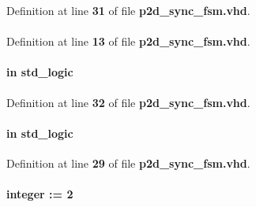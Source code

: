 Definition at line {\bf 31} of file {\bf p2d\+\_\+sync\+\_\+fsm.\+vhd}.

\paragraph[{ieee}]{\hspace{0.3cm}{\ttfamily [Library]}}\label{classp2d__sync__fsm_a0a6af6eef40212dbaf130d57ce711256}


Definition at line {\bf 13} of file {\bf p2d\+\_\+sync\+\_\+fsm.\+vhd}.

\paragraph[{mimo\+\_\+en}]{ {\bfseries \textcolor{keywordflow}{in}\textcolor{vhdlchar}{ }} {\bfseries \textcolor{comment}{std\+\_\+logic}\textcolor{vhdlchar}{ }} \hspace{0.3cm}{\ttfamily [Port]}}\label{classp2d__sync__fsm_a0c57670aee4f9fbfa3c286573012965a}


Definition at line {\bf 32} of file {\bf p2d\+\_\+sync\+\_\+fsm.\+vhd}.

\paragraph[{mode}]{ {\bfseries \textcolor{keywordflow}{in}\textcolor{vhdlchar}{ }} {\bfseries \textcolor{comment}{std\+\_\+logic}\textcolor{vhdlchar}{ }} \hspace{0.3cm}{\ttfamily [Port]}}\label{classp2d__sync__fsm_a219fe733f94bce997e904a6e45b1ac19}


Definition at line {\bf 29} of file {\bf p2d\+\_\+sync\+\_\+fsm.\+vhd}.

\paragraph[{n\+\_\+buff}]{ {\bfseries \textcolor{vhdlchar}{ }} {\bfseries \textcolor{comment}{integer}\textcolor{vhdlchar}{ }\textcolor{vhdlchar}{ }\textcolor{vhdlchar}{\+:}\textcolor{vhdlchar}{=}\textcolor{vhdlchar}{ }\textcolor{vhdlchar}{ } \textcolor{vhdldigit}{2} \textcolor{vhdlchar}{ }} \hspace{0.3cm}{\ttfamily [Generic]}}\label{classp2d__sync__fsm_ade20c9c4fcc309c75a7409d478ab4f7e}


